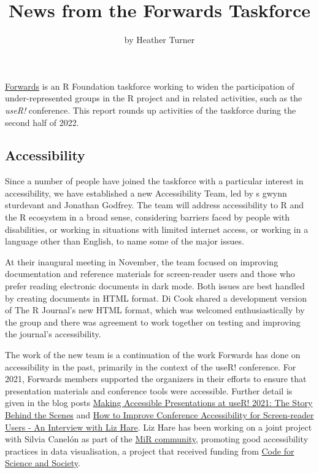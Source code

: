 \title{News from the Forwards Taskforce}
\author{by Heather Turner}

\maketitle


\href{https://forwards.github.io/}{Forwards} is an R Foundation
taskforce working to widen the participation of under-represented groups
in the R project and in related activities, such as the \emph{useR!}
conference. This report rounds up activities of the taskforce during the
second half of 2022.

\hypertarget{accessibility}{%
\subsection{Accessibility}\label{accessibility}}

Since a number of people have joined the taskforce with a particular
interest in accessibility, we have established a new Accessibility Team,
led by s gwynn sturdevant and Jonathan Godfrey. The team will address
accessibility to R and the R ecosystem in a broad sense, considering
barriers faced by people with disabilities, or working in situations
with limited internet access, or working in a language other than
English, to name some of the major issues.

At their inaugural meeting in November, the team focused on improving
documentation and reference materials for screen-reader users and those
who prefer reading electronic documents in dark mode. Both issues are
best handled by creating documents in HTML format. Di Cook shared a
development version of The R Journal's new HTML format, which was
welcomed enthusiastically by the group and there was agreement to work
together on testing and improving the journal's accessibility.

The work of the new team is a continuation of the work Forwards has done
on accessibility in the past, primarily in the context of the useR!
conference. For 2021, Forwards members supported the organizers in their
efforts to ensure that presentation materials and conference tools were
accessible. Further detail is given in the blog posts
\href{https://user2021.r-project.org/blog/2021/12/07/accessibility_awards_interview/}{Making
Accessible Presentations at useR! 2021: The Story Behind the Scenes} and
\href{https://user2021.r-project.org/blog/2021/11/04/accessibility_interview_liz_hare/}{How
to Improve Conference Accessibility for Screen-reader Users - An
Interview with Liz Hare}. Liz Hare has been working on a joint project
with Silvia Canelón as part of the \href{https://mircommunity.com/}{MiR
community}, promoting good accessibility practices in data
visualisation, a project that received funding from
\href{https://eventfund.codeforscience.org/announcing-the-new-cohort-of-event-fund-grantees/}{Code
for Science and Society}.

